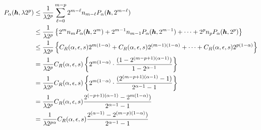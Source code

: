 \documentclass{amsart}
\begin{document}
\begin{align*}
    P_\alpha(\vh,\lambda 2^p)
    & \le \frac {1}{\lambda 2^p} \sum_{\ell = 0}^{m-p} 2^{m-\ell} n_{m -\ell} P_\alpha(\vh,2^{m-\ell}) \\
    & \le \frac {1}{\lambda 2^p} \left\{2^m n_m P_\alpha(\vh,2^m) + 2^{m-1} n_{m-1} P_\alpha(\vh,2^{m-1}) + \cdots + 2^p n_p P_\alpha(\vh,2^p) %
    \right\} \\ %
    & \le \frac {1}{\lambda 2^p} \left\{C_{R}(\alpha,\epsilon,s) 2^{m(1-\alpha)} + C_{R}(\alpha,\epsilon,s) 2^{(m-1)(1-\alpha)} + \cdots +  C_{R}(\alpha,\epsilon,s) 2^{p(1-\alpha)}\right\} \\
    & = \frac {1}{\lambda 2^p} C_{R}(\alpha,\epsilon,s) \left\{ 2^{m(1-\alpha)} \cdot \frac{(1 - 2^{(m-p+1)(\alpha - 1)})}{1 - 2^{\alpha-1}}\right\} \\
    & = \frac {1}{\lambda 2^p} C_{R}(\alpha,\epsilon,s) \left\{ 2^{m(1-\alpha)} \cdot \frac{(2^{(m-p+1)(\alpha - 1)}-1)}{2^{\alpha-1}-1}\right\} \\
    & = \frac {1}{\lambda 2^p} C_{R}(\alpha,\epsilon,s) \frac{2^{(-p+1)(\alpha -1)} - 2^{m(1-\alpha)})} {2^{\alpha-1}-1}\\
    & = \frac {1}{\lambda 2^{p\alpha}} C_{R}(\alpha,\epsilon,s) \frac{2^{(\alpha -1)} - 2^{(m-p)(1-\alpha)})} {2^{\alpha-1}-1}\\
\end{align*}




\end{document}
